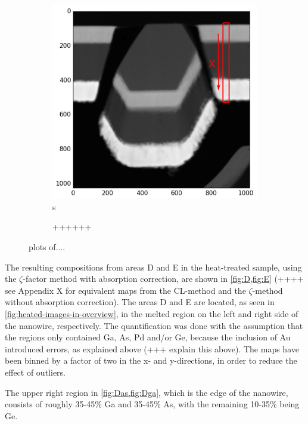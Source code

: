 \begin{figure}
\begin{subfigure}{.5\textwidth}
		\includegraphics[width=\linewidth]{fig/q/2_overview}s
		\caption{++++++}
		\label{fig:zeta_area2_overview}
	\end{subfigure}
	\caption{plots of....}
	\label{fig:zeta_area2}
\end{figure}

The resulting compositions from areas D and E in the heat-treated sample, using the $\zeta$-factor method with absorption correction, are shown in \cref{fig:D,fig:E} (++++ see Appendix X for equivalent maps from the CL-method and the $\zeta$-method without absorption correction). The areas D and E are located, as seen in \cref{fig:heated-images-in-overview}, in the melted region on the left and right side of the nanowire, respectively. The quantification was done with the assumption that the regions only contained Ga, As, Pd and/or Ge, because the inclusion of Au introduced errors, as explained above (+++ explain this above). The maps have been binned by a factor of two in the x- and y-directions, in order to reduce the effect of outliers.

The upper right region in \cref{fig:Das,fig:Dga}, which is the edge of the nanowire, consists of roughly 35-45\% Ga and 35-45\% As, with the remaining 10-35\% being Ge. 


